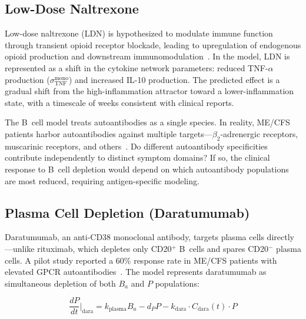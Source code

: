 \subsection{Low-Dose Naltrexone}

Low-dose naltrexone (LDN) is hypothesized to modulate immune function through transient opioid receptor blockade, leading to upregulation of endogenous opioid production and downstream immunomodulation~\cite{Polo2019LDN}. In the model, LDN is represented as a shift in the cytokine network parameters: reduced TNF-$\alpha$ production ($\sigma_{\text{TNF}}^{\text{mono}}$) and increased IL-10 production. The predicted effect is a gradual shift from the high-inflammation attractor toward a lower-inflammation state, with a timescale of weeks consistent with clinical reports.

\begin{open_question}
The B~cell model treats autoantibodies as a single species. In reality, ME/CFS patients harbor autoantibodies against multiple targets---$\beta_2$-adrenergic receptors, muscarinic receptors, and others~\cite{Loebel2016,Sotzny2021}. Do different autoantibody specificities contribute independently to distinct symptom domains? If so, the clinical response to B~cell depletion would depend on which autoantibody populations are most reduced, requiring antigen-specific modeling.
\end{open_question}

\subsection{Plasma Cell Depletion (Daratumumab)}

Daratumumab, an anti-CD38 monoclonal antibody, targets plasma cells directly---unlike rituximab, which depletes only CD20$^+$ B~cells and spares CD20$^-$ plasma cells. A pilot study reported a 60\% response rate in ME/CFS patients with elevated GPCR autoantibodies~\cite{Fluge2025daratumumab}. The model represents daratumumab as simultaneous depletion of both $B_a$ and $P$ populations:

\begin{equation}
\label{eq:daratumumab}
\frac{dP}{dt}\bigg|_{\text{dara}} = k_{\text{plasma}} B_a - d_P P - k_{\text{dara}} \cdot C_{\text{dara}}(t) \cdot P
\end{equation}

